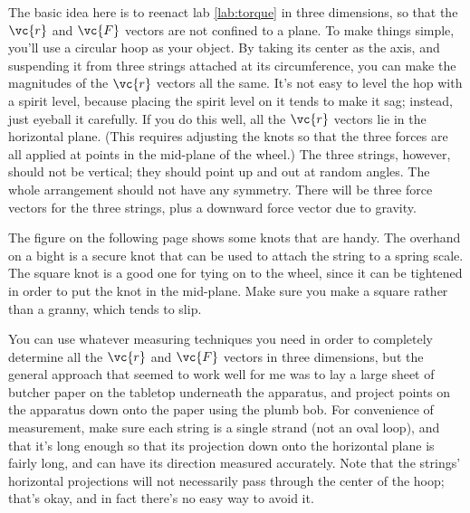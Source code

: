 \label{lab:torque-in-three-dimensions}

\apparatus
{}



\observations

The basic idea here is to reenact lab \ref{lab:torque} in three
dimensions, so that the $\vc{r}$ and $\vc{F}$ vectors are not confined
to a plane. To make things simple, you'll use a circular hoop as your
object. By taking its center as the axis, and suspending it from three
strings attached at its circumference, you can make the magnitudes of
the $\vc{r}$ vectors all the same.
It's not easy to level the hop with a spirit level, because placing the
spirit level on it tends to make it sag; instead, just eyeball it carefully.
If you do this well, all the $\vc{r}$ vectors lie in the
horizontal plane. (This requires adjusting the knots so that the three
forces are all applied at points in the mid-plane of the wheel.) The
three strings, however, should not be vertical; they should point up
and out at random angles. The whole arrangement should not have any
symmetry.  There will be three force vectors for the three strings,
plus a downward force vector due to gravity. 

The figure on the following page shows some knots that are handy. The overhand on a bight is a secure
knot that can be used to attach the string to a spring scale. The square knot
is a good one for tying on to the wheel, since it can be tightened in order
to put the knot in the mid-plane. Make sure you make a square rather than a granny,
which tends to slip.


You can use whatever measuring techniques you need in order to completely determine all the $\vc{r}$ and $\vc{F}$ vectors in three
dimensions, but the general approach that seemed to work well for me was to lay a large sheet of butcher paper on the tabletop underneath
the apparatus, and project points on the apparatus down onto the paper using the plumb bob.
For convenience of measurement, make sure each string is a single strand (not an oval loop), and that
it's long enough so that its projection down onto the horizontal plane is fairly long, and can have its direction measured accurately.
Note that the strings' horizontal projections will not necessarily pass through the center of the hoop; that's okay, and in fact
there's no easy way to avoid it.

